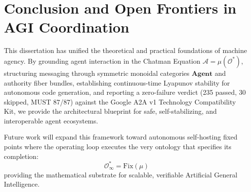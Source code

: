 \documentclass[11pt,twoside,openright]{report}
\theoremstyle{definition}
\theoremstyle{plain}
\theoremstyle{remark}
\newcommand{\CatAgent}{\mathbf{Agent}}
\begin{document}
\chapter{Conclusion and Open Frontiers in AGI Coordination}
\label{ch:conclusion}

This dissertation has unified the theoretical and practical foundations of machine agency. By grounding agent interaction in the Chatman Equation $\mathcal{A} = \mu(\mathcal{O}^*)$, structuring messaging through symmetric monoidal categories $\CatAgent$ and authority fiber bundles, establishing continuous-time Lyapunov stability for autonomous code generation, and reporting a zero-failure verdict (235 passed, 30 skipped, MUST 87/87) against the Google A2A v1 Technology Compatibility Kit, we provide the architectural blueprint for safe, self-stabilizing, and interoperable agent ecosystems.

Future work will expand this framework toward autonomous self-hosting fixed points where the operating loop executes the very ontology that specifies its completion:
\[
\mathcal{O}^*_{\infty} = \mathrm{Fix}(\mu)
\]
providing the mathematical substrate for scalable, verifiable Artificial General Intelligence.
\end{document}

